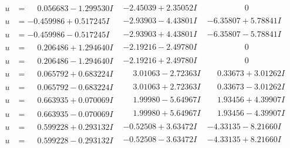 \documentclass[1p]{elsarticle_modified}
\theoremstyle{definition}
\begin{document}
$$\begin{array}{c|c|c}
\begin{aligned}
u &= \phantom{-}0.056683 - 1.299530 I\end{aligned}
 & -2.45039 + 2.35052 I & \phantom{-0.000000 } 0 \\ \hline\begin{aligned}
u &= -0.459986 + 0.517245 I\end{aligned}
 & -2.93903 - 4.43801 I & -6.35807 + 5.78841 I \\ \hline\begin{aligned}
u &= -0.459986 - 0.517245 I\end{aligned}
 & -2.93903 + 4.43801 I & -6.35807 - 5.78841 I \\ \hline\begin{aligned}
u &= \phantom{-}0.206486 + 1.294640 I\end{aligned}
 & -2.19216 - 2.49780 I & \phantom{-0.000000 } 0 \\ \hline\begin{aligned}
u &= \phantom{-}0.206486 - 1.294640 I\end{aligned}
 & -2.19216 + 2.49780 I & \phantom{-0.000000 } 0 \\ \hline\begin{aligned}
u &= \phantom{-}0.065792 + 0.683224 I\end{aligned}
 & \phantom{-}3.01063 - 2.72363 I & \phantom{-}0.33673 + 3.01262 I \\ \hline\begin{aligned}
u &= \phantom{-}0.065792 - 0.683224 I\end{aligned}
 & \phantom{-}3.01063 + 2.72363 I & \phantom{-}0.33673 - 3.01262 I \\ \hline\begin{aligned}
u &= \phantom{-}0.663935 + 0.070069 I\end{aligned}
 & \phantom{-}1.99980 - 5.64967 I & \phantom{-}1.93456 + 4.39907 I \\ \hline\begin{aligned}
u &= \phantom{-}0.663935 - 0.070069 I\end{aligned}
 & \phantom{-}1.99980 + 5.64967 I & \phantom{-}1.93456 - 4.39907 I \\ \hline\begin{aligned}
u &= \phantom{-}0.599228 + 0.293132 I\end{aligned}
 & -0.52508 + 3.63472 I & -4.33135 - 8.21660 I \\ \hline\begin{aligned}
u &= \phantom{-}0.599228 - 0.293132 I\end{aligned}
 & -0.52508 - 3.63472 I & -4.33135 + 8.21660 I \\ \hline\begin{aligned}

\end{aligned}
\end{array}$$
\end{document}
